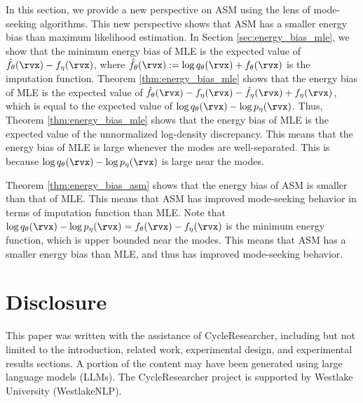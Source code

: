 \label{sec:mode_seeking}
In this section, we provide a new perspective on ASM using the lens of mode-seeking algorithms. This new perspective shows that ASM has a smaller energy bias than maximum likelihood estimation. In Section \ref{sec:energy_bias_mle}, we show that the minimum energy bias of MLE is the expected value of $\hat{f}_{\theta}(\rvx) - f_{\eta}(\rvx)$, where $\hat{f}_{\theta}(\rvx) := \log q_{\theta}(\rvx) + f_{\theta}(\rvx)$ is the imputation function. Theorem \ref{thm:energy_bias_mle} shows that the energy bias of MLE is the expected value of $\hat{f}_{\theta}(\rvx) - f_{\eta}(\rvx) - \hat{f}_{\eta}(\rvx) + f_{\eta}(\rvx)$, which is equal to the expected value of $\log q_{\theta}(\rvx) - \log p_{\eta}(\rvx)$. Thus, Theorem \ref{thm:energy_bias_mle} shows that the energy bias of MLE is the expected value of the unnormalized log-density discrepancy. This means that the energy bias of MLE is large whenever the modes are well-separated. This is because $\log q_{\theta}(\rvx) - \log p_{\eta}(\rvx)$ is large near the modes.

Theorem \ref{thm:energy_bias_asm} shows that the energy bias of ASM is smaller than that of MLE. This means that ASM has improved mode-seeking behavior in terms of imputation function than MLE. Note that $\log q_{\theta}(\rvx) - \log p_{\eta}(\rvx) = f_{\theta}(\rvx) - f_{\eta}(\rvx)$ is the minimum energy function, which is upper bounded near the modes. This means that ASM has a smaller energy bias than MLE, and thus has improved mode-seeking behavior.




\section{Disclosure}

This paper was written with the assistance of CycleResearcher, including but not limited to the introduction, related work, experimental design, and experimental results sections. A portion of the content may have been generated using large language models (LLMs). The CycleResearcher project is supported by Westlake University (WestlakeNLP).


